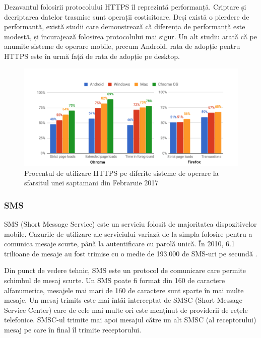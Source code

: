 \documentclass[12pt]{article}
\begin{document}
Dezavantul folosirii protocolului HTTPS îl reprezintă performanță. Criptare și decriptarea datelor trasmise sunt
operații costisitoare. Deși există o pierdere de performanță, există studii \cite{goldberg1998comparison} care demonstrează
că diferența de performanță este modestă, și încurajează folosirea protocolului mai sigur. Un alt studiu \cite{felt2017measuring}
arată că pe anumite sisteme de operare mobile, precum Android, rata de adopție pentru HTTPS este în urmă față de rata de adopție
pe desktop. 

\begin{figure}[H]
\centering
\includegraphics{http.png}
\caption{Procentul de utilizare HTTPS pe diferite sisteme de operare la sfarsitul unei saptamani din
Febraruie 2017 \cite{felt2017measuring}}
\end{figure}

\subsubsection{SMS}

SMS (Short Message Service) este un serviciu folosit de majoritatea dispozitivelor mobile. Cazurile de 
utilizare ale serviciului variază de la simpla folosire pentru a comunica mesaje scurte, până la 
autentificare cu parolă unică. În 2010, 6.1 trilioane de mesaje au fost trimise cu o medie de 193.000 de SMS-uri
pe secundă \cite{riseof3g}. 


Din punct de vedere tehnic, SMS este un protocol de comunicare care permite schimbul de mesaj scurte. Un SMS 
poate fi format din 160 de caractere alfanumerice, mesajele mai mari de 160 de caractere sunt sparte în 
mai multe mesaje. 
Un mesaj trimits este mai întâi interceptat de SMSC (Short Message Service Center) care de cele mai multe ori
este menținut de providerii de rețele telefonice. SMSC-ul trimite mai apoi mesajul către un alt SMSC (al receptorului)
mesaj pe care în final îl trimite receptorului.
\end{document}
